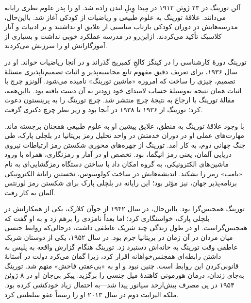 \documentclass[../../../include/open-logic-section]{subfiles}
\begin{document}


آلن تورینگ در ۲۳ ژوئن ۱۹۱۲ در مِیدا وِیلِ لندن زاده شد. او را پدر علوم
نظری رایانه می‌دانند. علاقهٔ تورینگ به علوم طبیعی و ریاضیات از کودکی آغاز
شد. بااین‌حال، مدرسه‌هایش در دوران کودکی بازتاب مناسبی از علایق او نداشتند
و بر ادبیات و آثار کلاسیک تأکید می‌کردند. ازاین‌رو در مدرسه عملکرد خوبی
نداشت و بسیاری از آموزگارانش او را سرزنش می‌کردند.


تورینگ دورهٔ کارشناسی را در کینگز کالجِ کمبریج گذراند و در آنجا ریاضیات
خواند. او در سال ۱۹۳۶، برای تعریف دقیق مفهوم تابع محاسبه‌پذیر و اثبات
تصمیم‌ناپذیری مسئلهٔ تصمیم، چیزی را ساخت که امروزه «ماشین تورینگ» نامیده
می‌شود. آلونزو چرچ با اثبات همان نتیجه به‌وسیلهٔ حساب لامبدای خود زودتر به
آن دست یافته بود. بااین‌همه، مقالهٔ تورینگ با ارجاع به نتیجهٔ چرچ منتشر
شد. چرچ تورینگ را به پرینستون دعوت کرد؛ تورینگ از ۱۹۳۶ تا ۱۹۳۸ در آنجا
بود و زیر نظر چرچ دکتری گرفت.

با وجود علاقهٔ تورینگ به منطق، علایق پیشین او به علوم طبیعی همچنان برجسته
ماند. مهارت‌های عملی او در دوران خدمتش در واحد تحلیل رمز بریتانیا در
بلچلی پارک، طی جنگ جهانی دوم، به کار آمد. تورینگ از چهره‌های محوری شکستن
رمز ارتباطات نیروی دریایی آلمان، یعنی رمز انیگما، بود. تخصص او در آمار و
رمزنگاری، همراه با ورود ماشین‌های الکترونیکی، به گروه امکان داد با ساختن
دستگاه رمزگشایی‌ای به نام «بامب» رمز را بشکند. اندیشه‌هایش در ساخت
کولوسوس، نخستین رایانهٔ الکترونیکی برنامه‌پذیر جهان، نیز مؤثر بود؛ این
رایانه در بلچلی پارک برای شکستن رمز لورنتس آلمان به کار رفت.

تورینگ همجنس‌گرا بود. بااین‌حال، در سال ۱۹۴۲ از جوآن کلارک، یکی از
همکارانش در بلچلی پارک، خواستگاری کرد؛ اما بعداً نامزدی را برهم زد و به او
گفت که همجنس‌گراست. او در طول زندگی چند شریک عاطفی داشت، درحالی‌که روابط
جنسی میان مردان در آن زمان در بریتانیا جرم بود. در سال ۱۹۵۲، یکی از
دوستان شریک عاطفی وقت تورینگ به خانه‌اش دستبرد زد. تورینگ هنگام گزارش
واقعه به پلیس به داشتن رابطه‌ای همجنس‌خواهانه اقرار کرد، زیرا گمان می‌کرد
دولت در آستانهٔ قانونی‌کردن این روابط است. چنین نبود و او به «بی‌عفتی
فاحش» متهم شد. تورینگ به‌جای زندان، درمان هورمونی کاهندهٔ میل جنسی را
برگزید. پیکر بی‌جان او در ۸ ژوئن ۱۹۵۴ در پی مصرف بیش‌ازحد سیانور پیدا
شد---به احتمال زیاد خودکشی کرده بود. ملکه الیزابت دوم در سال ۲۰۱۳ او را
رسماً عفو سلطنتی کرد.
\end{document}
